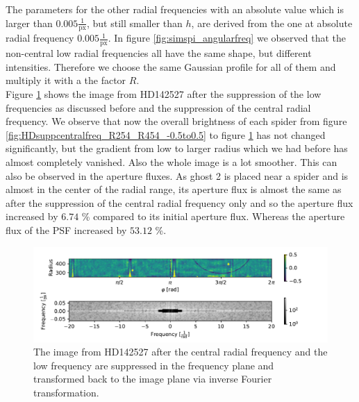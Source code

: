 The parameters for the other radial frequencies with an absolute value which is larger than $0.005 \frac{1}{\mathrm{px}}$, but still smaller than $h$, are derived from the one at absolute radial frequency $0.005 \frac{1}{\mathrm{px}}$. In figure \ref{fig:simspi_angularfreq} we observed that the non-central low radial frequencies all have the same shape, but different intensities. Therefore we choose the same Gaussian profile for all of them and multiply it with a the factor $R$.\\
Figure \ref{fig:HDsupplowfreq_R254_R454_-0.5to0.5.pdf} shows the image from HD142527 after the suppression of the low frequencies as discussed before and the suppression of the central radial frequency. We observe that now the overall brightness of each spider from figure \ref{fig:HDsuppcentralfreq_R254_R454_-0.5to0.5} to figure \ref{fig:HDsupplowfreq_R254_R454_-0.5to0.5.pdf} has not changed significantly, but the gradient from low to larger radius which we had before has almost completely vanished. Also the whole image is a lot smoother. This can also be observed in the aperture fluxes. As ghost 2 is placed near a spider and is almost in the center of the radial range, its aperture flux is almost the same as after the suppression of the central radial frequency only and so the aperture flux increased by $6.74$ \% compared to its initial aperture flux. Whereas the aperture flux of the PSF increased by $53.12$ \%. 
\begin{figure}[H]
	\centering
		\includegraphics[width=1.1\textwidth]{pics/HDsupplowfreq_R254_R454_-0.5to0.5.pdf}
		\caption{The image from HD142527 after the central radial frequency and the low frequency are suppressed in the frequency plane and transformed back to the image plane via inverse Fourier transformation.}
		\label{fig:HDsupplowfreq_R254_R454_-0.5to0.5.pdf}
\end{figure}


